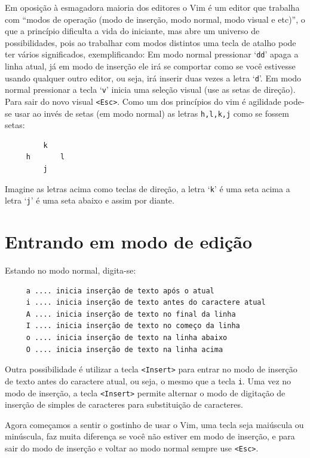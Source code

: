 Em oposição à esmagadora maioria dos editores o Vim é um editor que trabalha
com ``modos de operação (modo de inserção, modo normal, modo visual e etc)'', o
que a princípio dificulta a vida do iniciante, mas abre um universo de
possibilidades, pois ao trabalhar com modos distintos uma tecla de atalho pode
ter vários significados, exemplificando: Em
modo normal pressionar `{\tt dd}' apaga a linha atual, já em modo de inserção
ele irá se comportar como se você estivesse usando qualquer outro editor, ou
seja, irá inserir duas vezes a letra `{\tt d}'.  Em modo normal pressionar a
tecla `{\tt v}' inicia uma seleção visual (use as setas de direção).  Para sair
do novo visual \verb|<Esc>|.  Como um dos princípios do vim é agilidade pode-se
usar ao invés de setas (em modo normal) as letras {\tt h,l,k,j} como se fossem
setas:

\begin{verbatim}
         k
     h       l
         j
\end{verbatim}

Imagine as letras acima como teclas de direção, a letra `{\tt k}' é uma seta acima
a letra `{\tt j}' é uma seta abaixo e assim por diante.

\section{Entrando em modo de edição}\label{Entrando em modo de edição}
Estando no modo normal, digita-se:
\begin{verbatim}
     a .... inicia inserção de texto após o atual
     i .... inicia inserção de texto antes do caractere atual
     A .... inicia inserção de texto no final da linha
     I .... inicia inserção de texto no começo da linha
     o .... inicia inserção de texto na linha abaixo
     O .... inicia inserção de texto na linha acima
\end{verbatim}

Outra possibilidade é utilizar a tecla \verb|<Insert>| para entrar no modo de inserção de
texto antes do caractere atual, ou seja, o mesmo que a tecla \verb|i|. Uma vez no modo de 
inserção, a tecla \verb|<Insert>| permite alternar o modo de digitação de inserção de 
simples de caracteres para substituição de caracteres.

Agora começamos a sentir o gostinho de usar o Vim, uma tecla seja
maiúscula ou minúscula, faz muita diferença se você não estiver em
modo de inserção, e para sair do modo de inserção e voltar ao modo normal sempre 
use \verb|<Esc>|.

